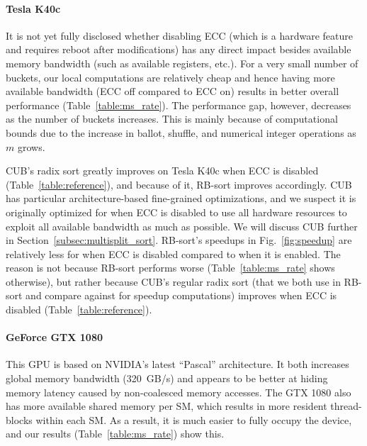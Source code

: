 \paragraph{Tesla K40c} It is not yet fully disclosed whether disabling ECC (which is a hardware feature and requires reboot after modifications) has any direct impact besides available memory bandwidth (such as available registers, etc.).
For a very small number of buckets, our local computations are relatively cheap and hence having more available bandwidth (ECC off compared to ECC on) results in better overall performance (Table~\ref{table:ms_rate}).
The performance gap, however, decreases as the number of buckets increases.
This is mainly because of computational bounds due to the increase in ballot, shuffle, and numerical integer operations as $m$ grows.

CUB's radix sort greatly improves on Tesla K40c when ECC is disabled (Table~\ref{table:reference}), and because of it, RB-sort improves accordingly.
CUB has particular architecture-based fine-grained optimizations, and we suspect it is originally optimized for when ECC is disabled to use all hardware resources to exploit all available bandwidth as much as possible. We will discuss CUB further in Section~\ref{subsec:multisplit_sort}.
RB-sort's speedups in Fig.~\ref{fig:speedup} are relatively less for when ECC is disabled compared to when it is enabled. The reason is not because RB-sort performs worse (Table~\ref{table:ms_rate} shows otherwise), but rather because  CUB's regular radix sort (that we both use in RB-sort and compare against for speedup computations) improves when ECC is disabled (Table~\ref{table:reference}).

\paragraph{GeForce GTX 1080}
This GPU is based on NVIDIA's latest ``Pascal'' architecture. It both increases global memory bandwidth (320~GB/s) and appears to be better at hiding memory latency caused by non-coalesced memory accesses. The GTX 1080 also has more available shared memory per SM, which results in more resident thread-blocks within each SM.
As a result, it is much easier to fully occupy the device, and our results (Table~\ref{table:ms_rate}) show this.
